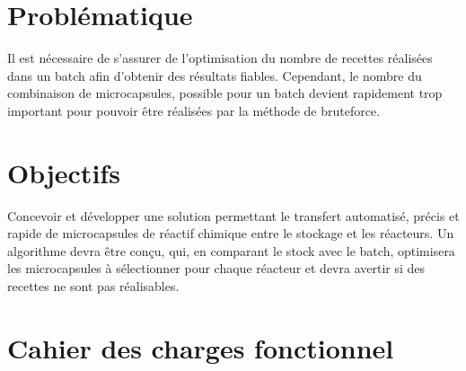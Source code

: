 \section{Problématique}
Il est nécessaire de s'assurer de l'optimisation du nombre de \glspl{recette} réalisées dans un \gls{batch} afin d'obtenir des résultats fiables. Cependant, le nombre du combinaison de \glspl{microcapsule}, possible pour un \gls{batch} devient rapidement trop important pour pouvoir être réalisées par la méthode de \gls{bruteforce}.
\section{Objectifs}
Concevoir et développer une solution permettant le transfert automatisé, précis et rapide de \glspl{microcapsule} de réactif chimique entre le stockage et les réacteurs. Un algorithme devra être conçu, qui, en comparant le stock avec le \gls{batch}, optimisera les microcapsules à sélectionner pour chaque réacteur et devra avertir si des \glspl{recette} ne sont pas réalisables.
\section{Cahier des charges fonctionnel}

